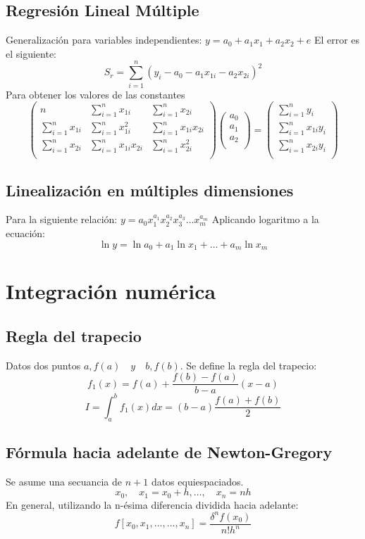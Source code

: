   \subsection{Regresión Lineal Múltiple}
  Generalización para variables independientes: $ y = a_0 + a_1x_1 + a_2x_2 + e$
  El error es el siguiente: 
  $$
  S_r = \sum_{i=1}^n (y_i-a_0 -a_1x_{1i} -a_2x_{2i})^2
  $$
  Para obtener los valores de las constantes 
  $$
    \left( 
    	\begin{array}{ccc}
 		n                  &  \sum_{i=1}^n x_{1i}    &   \sum_{i=1}^n x_{2i}\\
        \sum_{i=1}^n x_{1i}   & \sum_{i=1}^n x_{1i}^2 &  \sum_{i=1}^n x_{1i}x_{2i}\\
        \sum_{i=1}^n x_{2i}   &  \sum_{i=1}^n x_{1i}x_{2i} & \sum_{i=1}^n x_{2i}^2\\
		\end{array} 
    \right) 
    \left( 
    	\begin{array}{c}
 		 a_0\\ 
 		 a_1\\
         a_2\\
		\end{array} 
    \right) =
     \left( 
    	\begin{array}{c}
 		 \sum_{i=1}^n y_i\\ 
 		 \sum_{i=1}^n x_{1i}y_i\\
         \sum_{i=1}^n x_{2i}y_i\\
		\end{array} 
    \right)
  $$
  
 \begin{multicols}{2}
 	\subsection {Linealización en múltiples dimensiones}
    Para la siguiente relación: $y = a_0x_1^{a_1}x_2^{a_2}x_3^{a_3}\ldots x_m^{a_m}  $
    Aplicando logaritmo a la ecuación:
    $$
    	\ln{y} = \ln{a_0} + a_1\ln{x_1} +\ldots +  a_m\ln{x_m} 
    $$
    
    \section {Integración numérica }
    \subsection{Regla del trapecio}
    Datos dos puntos $ a,f(a) \quad y \quad b,f(b)$. 
    Se define la regla del trapecio:
    	$$
        	f_1(x) = f(a) + \frac{f(b)-f(a)}{b-a} (x-a)
        $$
    	$$I =  \int_a^b f_1(x)dx = (b-a) \frac{f(a)+ f(b)}{2}$$
      \subsection{Fórmula hacia adelante de Newton-Gregory}
      Se asume una secuancia de $n+1$ datos equiespaciados.
    $$
    	x_0, \quad x_1 = x_0 +h, \ldots, \quad x_n = nh
    $$
    En general, utilizando la n-ésima diferencia dividida hacia adelante: 
    $$
    f[x_0,x_1, \ldots, ..., x_n] = \frac{\delta^n f(x_0)}{n!h^n}
    $$
 \end{multicols} 
